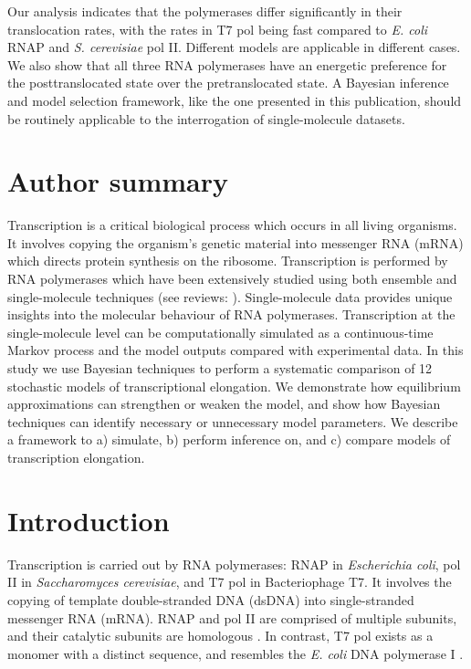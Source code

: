 \documentclass[10pt,letterpaper]{article}
\begin{document}
Our analysis indicates that the polymerases differ significantly in their translocation rates, with the rates in T7 pol being fast compared to \textit{ E. coli} RNAP and \textit{ S. cerevisiae} pol II. Different models are applicable in different cases. We also show that all three RNA polymerases have an energetic preference for the posttranslocated state over the pretranslocated state. A Bayesian inference and model selection framework, like the one presented in this publication, should be routinely applicable to the interrogation of single-molecule datasets.


\section*{Author summary}

Transcription is a critical biological process which occurs in all living organisms. It involves copying the organism's genetic material into messenger RNA (mRNA) which directs protein synthesis on the ribosome. Transcription is performed by RNA polymerases which have been extensively studied using both ensemble and single-molecule techniques (see reviews: \cite{herbert2008single, dangkulwanich2014molecular}). Single-molecule data provides unique insights into the molecular behaviour of RNA polymerases. Transcription at the single-molecule level can be computationally simulated as a continuous-time Markov process and the model outputs compared with experimental data. In this study we use Bayesian techniques to perform a systematic comparison of 12 stochastic models of transcriptional elongation. We demonstrate how equilibrium approximations can strengthen or weaken the model, and show how Bayesian techniques can identify necessary or unnecessary model parameters. We describe a framework to a) simulate, b) perform inference on, and c) compare models of transcription elongation.


\linenumbers

\section*{Introduction}
Transcription is carried out by RNA polymerases: RNAP in \textit{Escherichia coli}, pol II in \textit{ Saccharomyces cerevisiae}, and T7 pol in Bacteriophage T7. It involves the copying of template double-stranded DNA (dsDNA) into single-stranded messenger RNA (mRNA). RNAP and pol II are  comprised of multiple subunits, and their catalytic subunits are homologous \cite{sweetser1987prokaryotic, sosunov2003unified}. In contrast, T7 pol exists as a monomer with a distinct sequence, and resembles  the \textit{ E. coli} DNA polymerase I \cite{sousa1993crystal}.  \par
\end{document}
